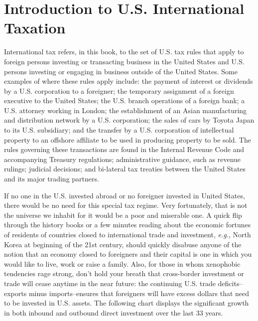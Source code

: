 \chapter{Introduction to U.S. International Taxation}

		
International tax refers, in this book, to the set of U.S. tax rules that apply to foreign persons investing or transacting business in the United States and U.S. persons investing or engaging in business outside of the United States.  Some examples of where these rules apply include:  the payment of interest or dividends by a U.S. corporation to a foreigner; the temporary assignment of a foreign executive to the United States; the U.S. branch operations of a foreign bank; a U.S. attorney working in London; the establishment of an Asian manufacturing and distribution network by a U.S. corporation; the sales of cars by Toyota Japan to its U.S. subsidiary; and the transfer by a U.S. corporation of intellectual property to an offshore affiliate to be used in producing property to be sold.  The rules governing these transactions are found in the Internal Revenue Code and accompanying Treasury regulations; administrative guidance, such as revenue rulings; judicial decisions; and bi-lateral tax treaties between the United States and its major trading partners.  

If no one in the U.S. invested abroad or no foreigner invested in United States, there would be no need for this special tax regime.  Very fortunately, that is not the universe we inhabit for it would be a poor and miserable one.  A quick flip through the history books or a few minutes reading about the economic fortunes of residents of countries closed to international trade and investment, \textit{e.g.}, North Korea at beginning of the 21st century, should quickly disabuse anyone of the notion that an economy closed to foreigners and their capital is one in which you would like to live, work or raise a family.  Also, for those in whom xenophobic tendencies rage strong, don't hold your breath that cross-border investment or trade will cease anytime in the near future:  the continuing U.S. trade deficits--exports minus imports--ensures that foreigners will have excess dollars that need to be invested in U.S. assets.  The following chart displays the significant growth in both inbound and outbound direct investment over the  last 33 years.

